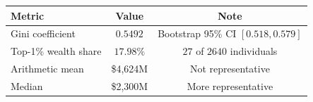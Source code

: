 \begin{tabular}{lcc}
\toprule
Metric & Value & Note \\
\midrule
Gini coefficient & $0.5492$ & Bootstrap 95\% CI $[0.518,0.579]$ \\
Top-1\% wealth share & $17.98\%$ & $27$ of $2640$ individuals \\
Arithmetic mean & \$4,624M & Not representative \\
Median & \$2,300M & More representative \\
\bottomrule
\end{tabular}

